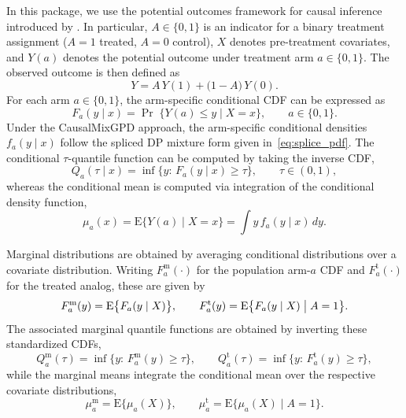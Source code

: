 \documentclass[11pt]{article}\usepackage[]{graphicx}\usepackage[]{xcolor}
\newcommand{\pkg}[1]{\textsf{#1}}
\begin{document}
In this package, we use the potential outcomes framework for causal inference introduced by
\citet{Rubin1974}. In particular, $A\in\{0,1\}$
is an indicator for a binary treatment assignment ($A=1$ treated, $A=0$
control), $X$ denotes pre-treatment covariates, and $Y(a)$ denotes the
potential outcome under treatment arm $a\in\{0,1\}$.  The observed outcome is then defined as
\begin{equation*}
Y = A\,Y(1) + \bigl(1-A\bigr)\,Y(0).
\end{equation*}
For each arm $a\in\{0,1\}$, the arm-specific conditional CDF
can be expressed as
\begin{equation*}
F_a(y\mid x)=\Pr\;\{Y(a)\le y \mid X=x\},\qquad a\in\{0,1\}.
\end{equation*}
Under the \pkg{CausalMixGPD} approach, the arm-specific conditional
densities $f_a(y\mid x)$ follow the spliced DP mixture form
given in~\eqref{eq:splice_pdf}.  The conditional $\tau$-quantile function can be computed by taking the inverse CDF,
\begin{equation*}
Q_a(\tau\mid x)=\inf\{y:\,F_a(y\mid x)\ge \tau\},\qquad \tau\in(0,1),
\end{equation*}
whereas the conditional mean is computed via integration of the conditional
density function,
\begin{equation*}
\mu_a(x)=\mathrm{E}\{Y(a)\mid X=x\}=\int y\, f_a(y\mid x)\,dy.
\end{equation*}


Marginal distributions are obtained by averaging
conditional distributions over a covariate distribution.  Writing
$F_a^{\mathrm{m}}(\cdot)$ for the population arm-$a$ CDF and
$F_a^{\mathrm{t}}(\cdot)$ for the treated analog, these are given by
\begin{equation*}
F_a^{\mathrm{m}}(y)=\mathrm{E}\bigl\{F_a(y\mid X)\bigr\},
\qquad
F_a^{\mathrm{t}}(y)=\mathrm{E}\bigl\{F_a(y\mid X)\bigm\vert A=1\bigr\}.
\end{equation*}
The associated marginal quantile functions are obtained by inverting
these standardized CDFs,
\begin{equation*}
Q_a^{\mathrm{m}}(\tau)=\inf\{y:\,F_a^{\mathrm{m}}(y)\ge \tau\},
\qquad
Q_a^{\mathrm{t}}(\tau)=\inf\{y:\,F_a^{\mathrm{t}}(y)\ge \tau\},
\end{equation*}
while the marginal means integrate the conditional mean over the
respective covariate distributions,
\begin{equation*}
\mu_a^{\mathrm{m}}=\mathrm{E}\bigl\{\mu_a(X)\bigr\},
\qquad
\mu_a^{\mathrm{t}}=\mathrm{E}\bigl\{\mu_a(X)\mid A=1\bigr\}.
\end{equation*}
\end{document}
